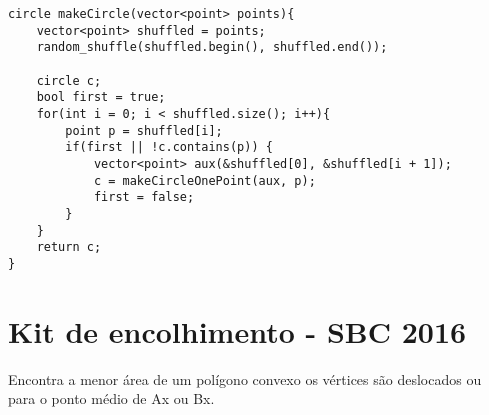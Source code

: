 \begin{multicols}{2}
\begin{lstlisting}
circle makeCircle(vector<point> points){
	vector<point> shuffled = points;
	random_shuffle(shuffled.begin(), shuffled.end());
	
	circle c;
	bool first = true;
	for(int i = 0; i < shuffled.size(); i++){
		point p = shuffled[i];
		if(first || !c.contains(p))	{
			vector<point> aux(&shuffled[0], &shuffled[i + 1]);
			c = makeCircleOnePoint(aux, p);
			first = false;
		}
	}
	return c;
}
	\end{lstlisting}
\end{multicols}

\section{Kit de encolhimento - SBC 2016}

Encontra a menor área de um polígono convexo os vértices são deslocados ou para o ponto médio de Ax ou Bx.

